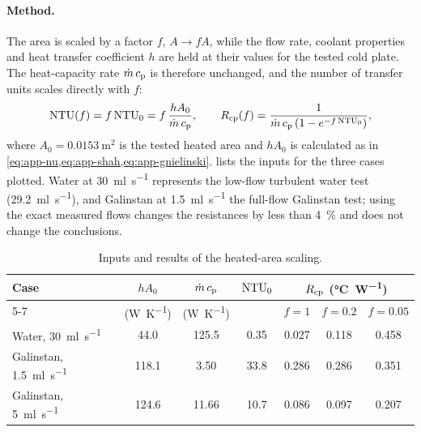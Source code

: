 \paragraph{Method.} The area is scaled by a factor $f$, $A \rightarrow fA$, while
the flow rate, coolant properties and heat transfer coefficient $h$ are held at
their values for the tested cold plate. The heat-capacity rate $\dot{m}\,c_{\mathrm{p}}$ is
therefore unchanged, and the number of transfer units scales directly with $f$:
\begin{equation}
  \mathrm{NTU}(f) = f\,\mathrm{NTU}_0 = f\,\frac{hA_0}{\dot{m}\,c_{\mathrm{p}}},
  \qquad
  R_{\mathrm{cp}}(f) = \frac{1}{\dot{m}\,c_{\mathrm{p}}\left(1 - e^{-f\,\mathrm{NTU}_0}\right)},
  \label{eq:app-area}
\end{equation}
where $A_0 = \SI{0.0153}{\metre\squared}$ is the tested heated area and $hA_0$
is calculated as in \cref{eq:app-nu,eq:app-shah,eq:app-gnielinski}.
 lists the inputs for the three cases plotted. Water at
\SI{30}{\milli\litre\per\second} represents the low-flow turbulent water test
(\SI{29.2}{\milli\litre\per\second}), and Galinstan at
\SI{1.5}{\milli\litre\per\second} the full-flow Galinstan test; using the exact
measured flows changes the resistances by less than \SI{4}{\percent} and does
not change the conclusions.

\begin{table}[htbp]
  \centering
  \caption{Inputs and results of the heated-area scaling.}
  \label{tab:app-area}
  \small
  \setlength{\tabcolsep}{5pt}
  \begin{tabular}{@{}lcccccc@{}}
    \toprule
    Case & $hA_0$ & $\dot{m}\,c_{\mathrm{p}}$ & $\mathrm{NTU}_0$ & \multicolumn{3}{c}{$R_{\mathrm{cp}}$ (\si{\celsius\per\watt})} \\
    \cmidrule(l){5-7}
     & (\si{\watt\per\kelvin}) & (\si{\watt\per\kelvin}) & & $f = 1$ & $f = 0.2$ & $f = 0.05$ \\
    \midrule
    Water, \SI{30}{\milli\litre\per\second}      & 44.0  & 125.5 & 0.35 & 0.027 & 0.118 & 0.458 \\
    Galinstan, \SI{1.5}{\milli\litre\per\second}  & 118.1 & 3.50  & 33.8 & 0.286 & 0.286 & 0.351 \\
    Galinstan, \SI{5}{\milli\litre\per\second}    & 124.6 & 11.66 & 10.7 & 0.086 & 0.097 & 0.207 \\
    \bottomrule
  \end{tabular}
\end{table}


